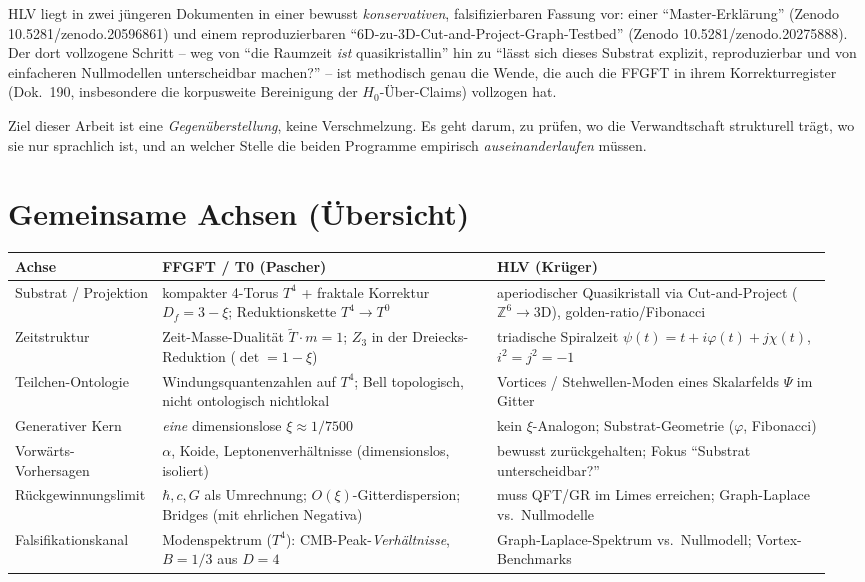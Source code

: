 HLV liegt in zwei jüngeren Dokumenten in einer bewusst \emph{konservativen}, falsifizierbaren
Fassung vor: einer \enquote{Master-Erklärung} (Zenodo 10.5281/zenodo.20596861) und einem
reproduzierbaren \enquote{6D-zu-3D-Cut-and-Project-Graph-Testbed} (Zenodo
10.5281/zenodo.20275888). Der dort vollzogene Schritt -- weg von \enquote{die Raumzeit
\emph{ist} quasikristallin} hin zu \enquote{lässt sich dieses Substrat explizit, reproduzierbar
und von einfacheren Nullmodellen unterscheidbar machen?} -- ist methodisch genau die Wende,
die auch die FFGFT in ihrem Korrekturregister (Dok.~190, insbesondere die korpusweite
Bereinigung der $H_0$-Über-Claims) vollzogen hat.

Ziel dieser Arbeit ist eine \emph{Gegenüberstellung}, keine Verschmelzung. Es geht darum,
zu prüfen, wo die Verwandtschaft strukturell trägt, wo sie nur sprachlich ist, und an welcher
Stelle die beiden Programme empirisch \emph{auseinanderlaufen} müssen.

\section{Gemeinsame Achsen (Übersicht)}

\begin{center}
\small
\begin{tabular}{@{}p{0.15\linewidth}p{0.40\linewidth}p{0.40\linewidth}@{}}
\hline
\textbf{Achse} & \textbf{FFGFT / T0 (Pascher)} & \textbf{HLV (Krüger)}\\
\hline
Substrat / Projektion
& kompakter 4-Torus $T^4$ + fraktale Korrektur $D_f=3-\xi$; Reduktionskette $T^4\!\to\!T^0$
& aperiodischer Quasikristall via Cut-and-Project ($\mathbb{Z}^6\!\to\!3$D), golden-ratio/Fibonacci\\
Zeitstruktur
& Zeit-Masse-Dualität $\tilde T\cdot m=1$; $Z_3$ in der Dreiecks-Reduktion ($\det=1-\xi$)
& triadische Spiralzeit $\psi(t)=t+i\varphi(t)+j\chi(t)$, $i^2=j^2=-1$\\
Teilchen-Ontologie
& Windungsquantenzahlen auf $T^4$; Bell topologisch, nicht ontologisch nichtlokal
& Vortices / Stehwellen-Moden eines Skalarfelds $\Psi$ im Gitter\\
Generativer Kern
& \emph{eine} dimensionslose $\xi\approx 1/7500$
& kein $\xi$-Analogon; Substrat-Geometrie ($\varphi$, Fibonacci)\\
Vorwärts-Vorhersagen
& $\alpha$, Koide, Leptonenverhältnisse (dimensionslos, isoliert)
& bewusst zurückgehalten; Fokus \enquote{Substrat unterscheidbar?}\\
Rückgewinnungslimit
& $\hbar,c,G$ als Umrechnung; $O(\xi)$-Gitterdispersion; Bridges (mit ehrlichen Negativa)
& muss QFT/GR im Limes erreichen; Graph-Laplace vs.\ Nullmodelle\\
Falsifikationskanal
& Modenspektrum ($T^4$): CMB-Peak-\emph{Verhältnisse}, $B=1/3$ aus $D=4$
& Graph-Laplace-Spektrum vs.\ Nullmodell; Vortex-Benchmarks\\
\hline
\end{tabular}
\end{center}

